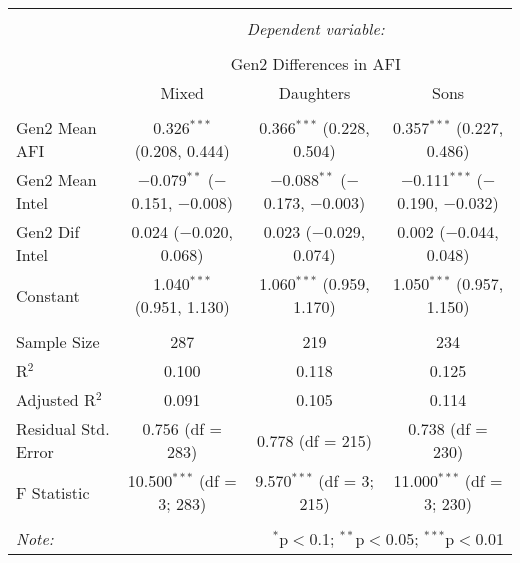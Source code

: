 
\begingroup 
\small 
\begin{tabular}{@{\extracolsep{1pt}}lccc} 
\\[-1.8ex]\hline 
\hline \\[-1.8ex] 
 & \multicolumn{3}{c}{\textit{Dependent variable:}} \\ 
\cline{2-4} 
\\[-1.8ex] & \multicolumn{3}{c}{Gen2 Differences in AFI} \\ 
 & Mixed & Daughters & Sons \\ 
\hline \\[-1.8ex] 
 Gen2 Mean AFI & 0.326$^{***}$ (0.208, 0.444) & 0.366$^{***}$ (0.228, 0.504) & 0.357$^{***}$ (0.227, 0.486) \\ 
  Gen2 Mean Intel & $-$0.079$^{**}$ ($-$0.151, $-$0.008) & $-$0.088$^{**}$ ($-$0.173, $-$0.003) & $-$0.111$^{***}$ ($-$0.190, $-$0.032) \\ 
  Gen2 Dif Intel & 0.024 ($-$0.020, 0.068) & 0.023 ($-$0.029, 0.074) & 0.002 ($-$0.044, 0.048) \\ 
  Constant & 1.040$^{***}$ (0.951, 1.130) & 1.060$^{***}$ (0.959, 1.170) & 1.050$^{***}$ (0.957, 1.150) \\ 
 \hline \\[-1.8ex] 
Sample Size & 287 & 219 & 234 \\ 
R$^{2}$ & 0.100 & 0.118 & 0.125 \\ 
Adjusted R$^{2}$ & 0.091 & 0.105 & 0.114 \\ 
Residual Std. Error & 0.756 (df = 283) & 0.778 (df = 215) & 0.738 (df = 230) \\ 
F Statistic & 10.500$^{***}$ (df = 3; 283) & 9.570$^{***}$ (df = 3; 215) & 11.000$^{***}$ (df = 3; 230) \\ 
\hline 
\hline \\[-1.8ex] 
\textit{Note:}  & \multicolumn{3}{r}{$^{*}$p$<$0.1; $^{**}$p$<$0.05; $^{***}$p$<$0.01} \\ 
\end{tabular} 
\endgroup 
